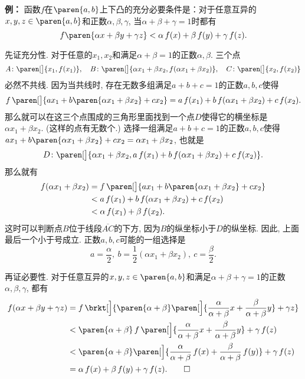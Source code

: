 \documentclass[a4paper,punct=CCT]{ctexbook}
\makeatletter
\theoremstyle{break}
\renewenvironment{proof}[1][\proofname]{\par
  \pushQED{\qed}%
  \normalfont \topsep6\p@\@plus6\p@\relax
  \trivlist
  \item[]\ignorespaces
}{%
  \popQED\endtrivlist\@endpefalse
}
\newenvironment{example}[1][]{\noindent\textbf{例#1：}}{}
\makeatother
\begin{document}
\begin{example}
  函数\(f\)在\(\paren{a,b}\)上下凸的充分必要条件是：对于任意互异的\(x, y, z \in \paren{a,b}\)和正数\(\alpha, \beta, \gamma\), 当\(\alpha+\beta+\gamma=1\)时都有
  \[
    f\paren{\alpha x + \beta y + \gamma z} < \alpha\,f(x) + \beta\,f(y) + \gamma\,f(z).
  \]

  \begin{proof}
    先证充分性.  对于任意的\(x_1, x_2\)和满足\(\alpha+\beta=1\)的正数\(\alpha, \beta\).  三个点
    \[
      A\colon \paren[\big]{x_1, f(x_1)},\quad B\colon \paren[\big]{\alpha x_1 + \beta x_2, f(\alpha x_1 + \beta x_2)},\quad C\colon \paren[\big]{x_2, f(x_2)}
    \]
    必然不共线.  因为当共线时, 存在无数多组满足\(a+b+c=1\)的正数\(a, b, c\)使得
    \[
      f\,\paren[\big]{a x_1 + b\paren{\alpha x_1 + \beta x_2}  + c x_2} = a\,f(x_1) + b\,f(\alpha x_1 + \beta x_2) + c\,f(x_2).
    \]
    那么就可以在这三个点围成的三角形里面找到一个点\(D\)使得它的横坐标是\(\alpha x_1 + \beta x_2\).  (这样的点有无数个.)  选择一组满足\(a+b+c=1\)的正数\(a, b, c\)使得\(a x_1 + b\paren{\alpha x_1 + \beta x_2}  + c x_2 = \alpha x_1 + \beta x_2 \), 也就是
    \[
      D\colon \paren[\big]{\alpha x_1 + \beta x_2, a\,f(x_1) + b\,f(\alpha x_1 + \beta x_2) + c\,f(x_2)}.
    \]
    那么就有
    \[
      \begin{split}
        f(\alpha x_1 + \beta x_2)
        &= f\,\paren[\big]{a x_1 + b\paren{\alpha x_1 + \beta x_2}  + c x_2} \\
        &< a\,f(x_1) + b\,f(\alpha x_1 + \beta x_2) + c\,f(x_2) \\
        &< \alpha\,f(x_1) + \beta\,f(x_2).
      \end{split}
    \]
    这时可以判断点\(B\)位于线段\(\overline{AC}\)的下方, 因为\(B\)的纵坐标小于\(D\)的纵坐标.  因此, 上面最后一个小于号成立.  正数\(a, b, c\)可能的一组选择是
    \[
      a = \frac\alpha2,\ b = \frac12(\alpha x_1 + \beta x_2),\ c = \frac\beta2.
    \]

    再证必要性.  对于任意互异的\(x, y, z \in \paren{a,b}\)和满足\(\alpha+\beta+\gamma=1\)的正数\(\alpha, \beta, \gamma\), 都有
    \[
      \begin{split}
        f(\alpha x + \beta y + \gamma z)
        &= f\,\brkt[\Big]{\paren{\alpha+\beta}\paren[\Big]{\frac{\alpha}{\alpha+\beta} x + \frac{\beta}{\alpha+\beta} y} + \gamma z} \\
        &< \paren{\alpha+\beta}\,f\,\paren[\Big]{\frac{\alpha}{\alpha+\beta} x + \frac{\beta}{\alpha+\beta} y} + \gamma\,f(z) \\
        &< \paren{\alpha+\beta}\paren[\Big]{\frac{\alpha}{\alpha+\beta}\,f(x) + \frac{\beta}{\alpha+\beta}\,f(y)} + \gamma\,f(z) \\
        &= \alpha\,f(x) + \beta\,f(y) + \gamma\,f(z). \qedhere
      \end{split}
    \]


\end{proof}
\end{example}
\end{document}

